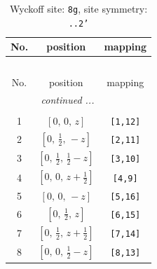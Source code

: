 \documentclass[fleqn,8pt]{jsarticle}
\begin{document}
\renewcommand{\arraystretch}{1.2}
\begin{longtable}{ccc}
\caption{Wyckoff site: {\tt 8g}, site symmetry: {\tt ..2'}}
 \\
 \hline \hline
No. & position & mapping \\ \hline \endfirsthead

\multicolumn{2}{l}{\tablename\ \thetable{}} \\
 \hline \hline
No. & position & mapping \\ \hline \endhead

 \hline \hline
\multicolumn{2}{r}{\footnotesize\it continued ...} \\ \endfoot

 \hline \hline
\multicolumn{2}{r}{} \\ \endlastfoot

1 & $\left[ 0,\, 0,\, z \right]$ & {\tt [1,12]} \\ \hline
2 & $\left[ 0,\, \frac{1}{2},\, - z \right]$ & {\tt [2,11]} \\ \hline
3 & $\left[ 0,\, \frac{1}{2},\, \frac{1}{2} - z \right]$ & {\tt [3,10]} \\ \hline
4 & $\left[ 0,\, 0,\, z + \frac{1}{2} \right]$ & {\tt [4,9]} \\ \hline
5 & $\left[ 0,\, 0,\, - z \right]$ & {\tt [5,16]} \\ \hline
6 & $\left[ 0,\, \frac{1}{2},\, z \right]$ & {\tt [6,15]} \\ \hline
7 & $\left[ 0,\, \frac{1}{2},\, z + \frac{1}{2} \right]$ & {\tt [7,14]} \\ \hline
8 & $\left[ 0,\, 0,\, \frac{1}{2} - z \right]$ & {\tt [8,13]} \\
\end{longtable}
\renewcommand{\arraystretch}{1.2}
\end{document}
